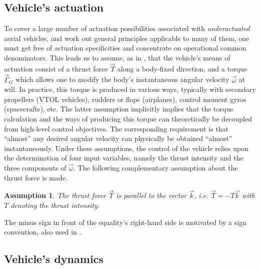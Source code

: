 \documentclass[twocolumn]{autart}
\newtheorem{hypothesis}{Assumption}
\theoremstyle{definition}
\theoremstyle{definition}
\begin{document}
\subsection{Vehicle's actuation}
\label{sec:actuation}
To cover a large number of actuation possibilities associated with {\em underactuated} aerial vehicles, and work out general principles applicable to many of
them, one must get free of actuation specificities and concentrate on operational common denominators. This leads us to assume, as in \cite{2009_HUA}, that the vehicle's means of actuation
consist of a thrust force $\vec{T}$ along a body-fixed direction, and a torque $\vec{\Gamma}_G$ which allows one to modify the body's instantaneous angular velocity $\vec{\omega}$ at will. In practice, this torque is produced in various ways, typically with secondary propellers (VTOL vehicles), rudders or flaps (airplanes), control moment gyros (spacecrafts), etc. The latter assumption implicitly implies that the torque calculation and the ways of producing this torque can theoretically be decoupled from high-level control objectives. The corresponding requirement is that ``almost'' any desired angular velocity can physically be obtained ``almost'' instantaneously. Under these assumptions, the control of the vehicle relies upon the determination of four input variables, namely the thrust intensity and the three components of $\vec{\omega}$. The following complementary assumption about the thrust force is made.

\begin{hypothesis}
\label{hy:actuation}
The thrust force $\vec{T}$ is parallel to the vector $\vec{k}$, i.e. $\vec{T} = -T\vec{k}$ with $T$ denoting the thrust intensity.
\end{hypothesis}
The minus sign in front of the equality's right-hand side is motivated by a sign convention, also used in \cite{2009_HUA}.

\subsection{Vehicle's dynamics}
\label{subsec:systemmodeling}
\end{document}
